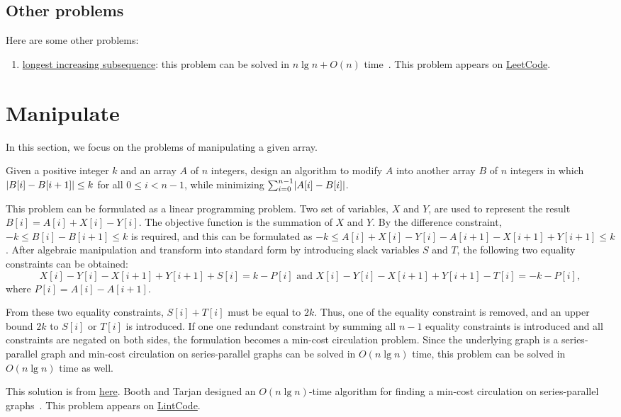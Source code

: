 \subsection{Other problems}
Here are some other problems:
\begin{enumerate}
\item \href{https://en.wikipedia.org/wiki/Longest_increasing_subsequence}{longest increasing subsequence}: this problem can be solved in $n \lg n + O(n)$ time~\cite{Fredman1975}. This problem appears on \href{https://leetcode.com/problems/longest-increasing-subsequence/}{LeetCode}.
\end{enumerate}

\section{Manipulate}
In this section, we focus on the problems of manipulating a given array.

\begin{Exercise}
Given a positive integer $k$ and an array $A$ of $n$ integers, design an algorithm to modify $A$ into another array $B$ of $n$ integers in which $\lvert B[i] - B[i + 1]\rvert \leq k$ for all $0 \leq i < n - 1$, while minimizing $\sum_{i=0}^{n - 1} \lvert A[i] - B[i]\rvert$.
\end{Exercise}
\begin{Answer}
This problem can be formulated as a linear programming problem.
Two set of variables, $X$ and $Y$, are used to represent the result $B[i] = A[i] + X[i] - Y[i]$. 
The objective function is the summation of $X$ and $Y$. 
By the difference constraint, $ -k \leq B[i] - B[i+1] \leq k$ is required, and this can be formulated as $-k \leq  A[i] + X[i] - Y[i] - A[i+1] - X[i+1] + Y[i+1] \leq k$. 
After algebraic manipulation and transform into standard form by introducing slack variables $S$ and $T$, the following two equality constraints can be obtained: 
\[ X[i] - Y[i] - X[i+1] + Y[i+1] + S[i] = k - P[i] \text{ and } X[i] - Y[i] - X[i+1] + Y[i+1] - T[i] = -k - P[i],\]
 where $P[i] = A[i] - A[i+1]$. 

From these two equality constraints, $S[i] + T[i]$ must be equal to  $2k$. 
Thus, one of the equality constraint is removed, and an upper bound $2k$ to $S[i]$ or $T[i]$ is introduced.
If one one redundant constraint by summing all $n - 1$ equality constraints is introduced and all constraints are negated on both sides, the formulation becomes a min-cost circulation problem.
Since the underlying graph is a series-parallel graph and min-cost circulation on series-parallel graphs can be solved in $O(n \lg n)$ time, this problem can be solved in $O(n \lg n)$ time as well.
\begin{remark}
This solution is from \href{http://www.chaoxuprime.com/posts/2015-01-27-bounded-regression-on-data-streams.html}{here}.
Booth and Tarjan designed an $O(n \lg n)$-time algorithm for finding a min-cost circulation on series-parallel graphs~\cite{Booth1993}.
This problem appears on \href{http://www.lintcode.com/en/problem/minimum-adjustment-cost/}{LintCode}.
\end{remark}
\end{Answer}


